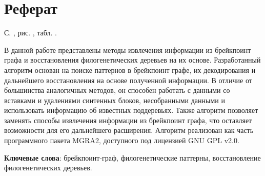 \thispagestyle{empty}
\setcounter{page}{1}

\section*{Реферат}
\noindent
С. ,  рис. , табл. .

В данной работе представлены методы извлечения информации из брейкпоинт графа и восстановления филогенетических деревьев на их основе.
Разработанный алгоритм основан на поиске паттернов в брейкпоинт графе, их декодирования и дальнейшего восстановления на основе полученной информации.
В отличие от большинства аналогичных методов, он способен работать с данными со вставками и удалениями синтенных блоков, несобранными данными и
использовать информацию об известных поддеревьях.
Также алгоритм позволяет заменять способы извлечения информации из брейкпоинт графа, что оставляет возможности для его дальнейшего расширения.
Алгоритм реализован как часть программного пакета MGRA2, доступного под лицензией GNU GPL v2.0.


\textbf{Ключевые слова}: брейкпоинт-граф, филогенетические паттерны, восстановление филогенетических деревьев.

\pagebreak
